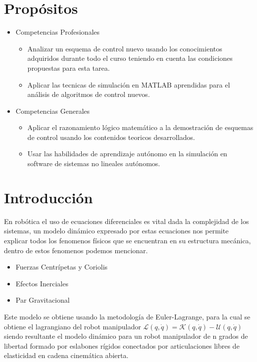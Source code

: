 \documentclass[12pt]{article}
\begin{document}
\section{Propósitos}
\begin{itemize}
    \item Competencias Profesionales
    \begin{itemize}
        \item Analizar un esquema de control nuevo usando los conocimientos adquiridos durante todo el curso teniendo en cuenta las condiciones propuestas para esta tarea.
        \item Aplicar las tecnicas de simulación en MATLAB aprendidas para el análisis de algoritmos de control nuevos.
    \end{itemize}
    \item Competencias Generales
    \begin{itemize}
        \item Aplicar el razonamiento lógico matemático a la demostración de esquemas de control usando los contenidos teoricos desarrollados.
        \item Usar las habilidades de aprendizaje autónomo en la simulación en software de sistemas no lineales  autónomos. 
    \end{itemize}
\end{itemize}
\newpage
\section{Introducción}

En robótica el uso de ecuaciones diferenciales es vital dada la complejidad de los sistemas, un modelo dinámico expresado por estas ecuaciones nos permite explicar todos los fenomenos físicos que se encuentran en su estructura mecánica, dentro de estos fenomenos podemos mencionar.
\begin{itemize}
    \item Fuerzas Centrípetas y Coriolis
    \item Efectos Inerciales
    \item Par Gravitacional
\end{itemize}

Este modelo se obtiene usando la metodología de Euler-Lagrange, para la cual se obtiene el lagrangiano del robot manipulador $\mathcal{L}(q,\dot{q})=\mathcal{K}(q,\dot{q})-\mathcal{U}(q,\dot{q})$ siendo resultante el modelo dinámico para un robot manipulador de n grados de libertad formado por eslabones rígidos conectados por articulaciones libres de elasticidad en cadena cinemática abierta.
\end{document}
